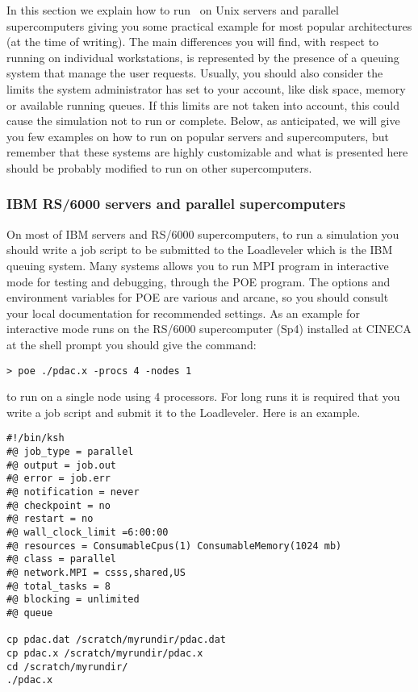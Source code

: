 In this section we explain how to run \PDAC\ on Unix servers
and parallel supercomputers giving you some practical example
for most popular architectures (at the time of writing).
The main differences you will find, with respect to running on 
individual workstations,
is represented by the presence of a queuing system that
manage the user requests. Usually, you should also 
consider the limits the system administrator has set to your account,
like disk space, memory or available running queues. 
If this limits are not taken into account, this could cause
the simulation not to run or complete.
Below, as anticipated, we will give you few examples on how to run
on popular servers and supercomputers, but remember that 
these systems are highly customizable and what is presented here
should be probably modified to run on other supercomputers.

\subsubsection{IBM RS/6000 servers and parallel supercomputers}

On most of IBM servers and RS/6000 supercomputers, to run a simulation you
should write a job script to be submitted to the Loadleveler which
is the IBM queuing system.
Many systems allows you to run MPI program in interactive mode for
testing and debugging, through the POE program.  
The options and environment variables for POE are various and arcane, 
so you should consult your local documentation for recommended settings.  
As an example for interactive mode runs on the RS/6000 supercomputer
(Sp4) installed at CINECA at the shell prompt you should give the
command:

\begin{verbatim}
> poe ./pdac.x -procs 4 -nodes 1 
\end{verbatim}

to run on a single node using 4 processors.
For long runs it is required that you write a job script
and submit it to the Loadleveler. Here is an example.

\begin{verbatim}
#!/bin/ksh
#@ job_type = parallel
#@ output = job.out
#@ error = job.err
#@ notification = never
#@ checkpoint = no
#@ restart = no
#@ wall_clock_limit =6:00:00
#@ resources = ConsumableCpus(1) ConsumableMemory(1024 mb)
#@ class = parallel
#@ network.MPI = csss,shared,US
#@ total_tasks = 8
#@ blocking = unlimited
#@ queue

cp pdac.dat /scratch/myrundir/pdac.dat
cp pdac.x /scratch/myrundir/pdac.x
cd /scratch/myrundir/
./pdac.x
\end{verbatim}

